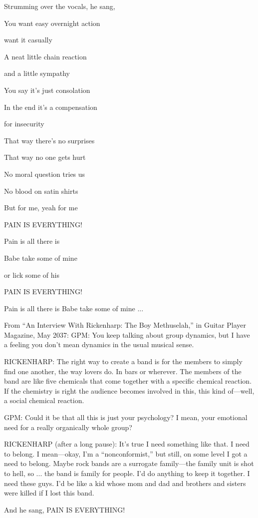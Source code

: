 Strumming over the vocals, he sang,

You want easy overnight action

want it casually

A neat little chain reaction

and a little sympathy

You say it's just consolation

In the end it's a compensation

for insecurity

That way there's no surprises

That way no one gets hurt

No moral question tries us

No blood on satin shirts

But for me, yeah for me

PAIN IS EVERYTHING!

Pain is all there is

Babe take some of mine

or lick some of his

PAIN IS EVERYTHING!

Pain is all there is Babe take some of mine ...

From ``An Interview With Rickenharp: The Boy Methuselah,'' in Guitar Player Magazine, May 2037: GPM: You keep talking about group dynamics, but I have a feeling you don't mean dynamics in the usual musical sense.

RICKENHARP: The right way to create a band is for the members to simply find one another, the way lovers do. In bars or wherever. The members of the band are like five chemicals that come together with a specific chemical reaction. If the chemistry is right the audience becomes involved in this, this kind of—well, a social chemical reaction.

GPM: Could it be that all this is just your psychology? I mean, your emotional need for a really organically whole group?

RICKENHARP (after a long pause): It's true I need something like that. I need to belong. I mean—okay, I'm a ``nonconformist,'' but still, on some level I got a need to belong. Maybe rock bands are a surrogate family—the family unit is shot to hell, so ... the band is family for people. I'd do anything to keep it together. I need these guys. I'd be like a kid whose mom and dad and brothers and sisters were killed if I lost this band.

And he sang, PAIN IS EVERYTHING!

